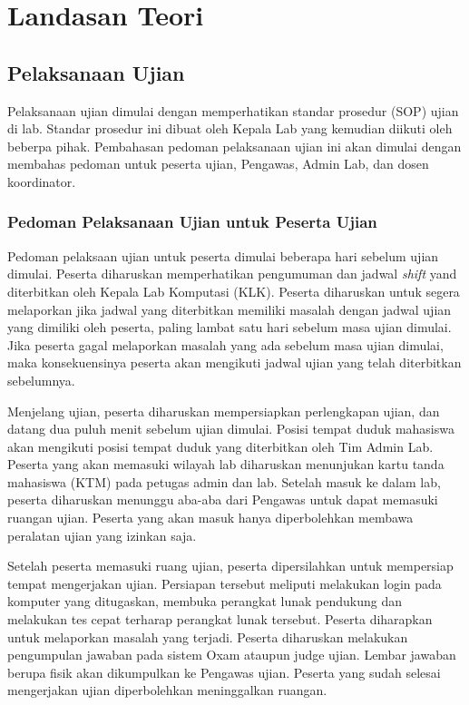 \chapter{Landasan Teori}
\label{chap:teori}

\section{Pelaksanaan Ujian}
    Pelaksanaan ujian dimulai dengan memperhatikan standar prosedur (SOP) ujian
    di lab\cite{lab:buku-sop}. Standar prosedur ini dibuat oleh Kepala Lab yang
    kemudian diikuti oleh beberpa pihak. Pembahasan pedoman pelaksanaan ujian
    ini akan dimulai dengan membahas pedoman untuk peserta ujian, Pengawas,
    Admin Lab, dan dosen koordinator.
    
\subsection{Pedoman Pelaksanaan Ujian untuk Peserta Ujian}
    Pedoman pelaksaan ujian untuk peserta dimulai beberapa hari sebelum ujian
    dimulai. Peserta diharuskan memperhatikan pengumuman dan jadwal
    \textit{shift} yand diterbitkan oleh Kepala Lab Komputasi (KLK). Peserta
    diharuskan untuk segera melaporkan jika jadwal yang diterbitkan memiliki
    masalah dengan jadwal ujian yang dimiliki oleh peserta, paling lambat satu
    hari sebelum masa ujian dimulai. Jika peserta gagal melaporkan masalah yang
    ada sebelum masa ujian dimulai, maka konsekuensinya peserta akan mengikuti
    jadwal ujian yang telah diterbitkan sebelumnya.

    Menjelang ujian, peserta diharuskan mempersiapkan perlengkapan ujian, dan
    datang dua puluh menit sebelum ujian dimulai. Posisi tempat duduk mahasiswa
    akan mengikuti posisi tempat duduk yang diterbitkan oleh Tim Admin Lab.
    Peserta yang akan memasuki wilayah lab diharuskan menunjukan kartu tanda
    mahasiswa (KTM) pada petugas admin dan lab. Setelah masuk ke dalam lab,
    peserta diharuskan menunggu aba-aba dari Pengawas untuk dapat memasuki
    ruangan ujian. Peserta yang akan masuk hanya diperbolehkan membawa peralatan
    ujian yang izinkan saja.

    Setelah peserta memasuki ruang ujian, peserta dipersilahkan untuk mempersiap
    tempat mengerjakan ujian. Persiapan tersebut meliputi melakukan login pada
    komputer yang ditugaskan, membuka perangkat lunak pendukung dan melakukan tes
    cepat terharap perangkat lunak tersebut. Peserta diharapkan untuk melaporkan
    masalah yang terjadi. Peserta diharuskan melakukan pengumpulan jawaban pada
    sistem Oxam ataupun judge ujian. Lembar jawaban berupa fisik akan
    dikumpulkan ke Pengawas ujian. Peserta yang sudah selesai mengerjakan ujian
    diperbolehkan meninggalkan ruangan.

